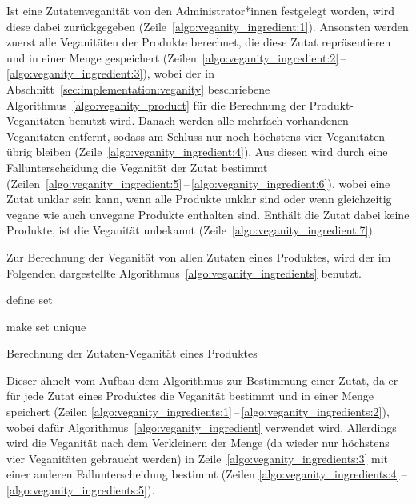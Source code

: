 Ist eine Zutatenveganität von den Administrator*innen festgelegt worden, wird 
diese dabei zurückgegeben (Zeile~\ref{algo:veganity_ingredient:1}).
Ansonsten werden zuerst alle Veganitäten der Produkte berechnet, die diese 
Zutat repräsentieren und in einer Menge gespeichert 
(Zeilen~\ref{algo:veganity_ingredient:2}\,--\,\ref{algo:veganity_ingredient:3}), 
wobei der in Abschnitt~\ref{sec:implementation:veganity} beschriebene 
Algorithmus~\ref{algo:veganity_product} für die Berechnung der 
Produkt-Veganitäten benutzt wird.
Danach werden alle mehrfach vorhandenen Veganitäten entfernt, sodass am Schluss 
nur noch höchstens vier Veganitäten übrig bleiben 
(Zeile~\ref{algo:veganity_ingredient:4}).
Aus diesen wird durch eine
Fallunterscheidung die Veganität der Zutat bestimmt 
(Zeilen~\ref{algo:veganity_ingredient:5}\,--\,\ref{algo:veganity_ingredient:6}), 
wobei eine Zutat unklar sein kann, wenn alle Produkte unklar sind oder wenn 
gleichzeitig vegane wie auch unvegane Produkte enthalten sind.
Enthält die Zutat dabei keine Produkte, ist die Veganität unbekannt 
(Zeile~\ref{algo:veganity_ingredient:7}).

Zur Berechnung der Veganität von allen Zutaten eines Produktes, 
wird der im Folgenden dargestellte Algorithmus~\ref{algo:veganity_ingredients} 
benutzt.

\begin{algorithm}[ht]
  \SetAlgoLined
  \BlankLine
  
  define set\label{algo:veganity_ingredients:1}\;
    \label{algo:veganity_ingredients:2}

  \BlankLine
  make set unique\label{algo:veganity_ingredients:3}
  \BlankLine
  
  \label{algo:veganity_ingredients:5}
 
  \caption{Berechnung der Zutaten-Veganität eines Produktes}
  \label{algo:veganity_ingredients}
\end{algorithm}

Dieser ähnelt vom Aufbau dem Algorithmus zur Bestimmung einer Zutat, da er für 
jede Zutat eines Produktes die Veganität bestimmt und in einer Menge speichert 
(Zeilen 
\ref{algo:veganity_ingredients:1}\,--\,\ref{algo:veganity_ingredients:2}), wobei 
dafür Algorithmus~\ref{algo:veganity_ingredient} verwendet wird.
Allerdings wird die Veganität nach dem Verkleinern der Menge (da wieder nur 
höchstens vier Veganitäten gebraucht werden) in 
Zeile~\ref{algo:veganity_ingredients:3} mit einer anderen Fallunterscheidung 
bestimmt 
(Zeilen 
\ref{algo:veganity_ingredients:4}\,--\,\ref{algo:veganity_ingredients:5}).

